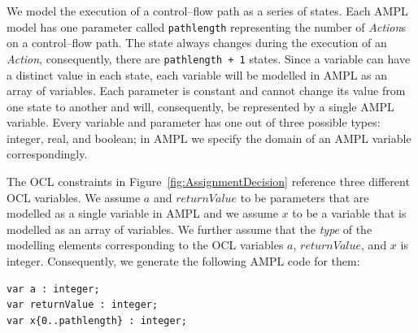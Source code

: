 \documentclass[runningheads,a4paper]{llncs}%
\newcommand{\UMLType}[1]{\textsf{\textit{#1}}} %
\newcommand{\UMLReference}[1]{\textsf{\textit{#1}}} %
\newcommand{\AMPLCode}[1]{\texttt{#1}}
\begin{document}
We model the execution of a control--flow path as a series of states. Each AMPL
model has one parameter called \AMPLCode{pathlength} representing the number of
\UMLType{Action}s on a control--flow path. The state always changes during the
execution of an \UMLType{Action}, consequently, there are \AMPLCode{pathlength +
1} states. Since a variable can have a distinct value in each state, each
variable will be modelled in AMPL as an array of variables. Each parameter is
constant and cannot change its value from one state to another and will,
consequently, be represented by a single AMPL variable. Every variable and
parameter has one out of three possible types: integer, real, and boolean; in
AMPL we specify the domain of an AMPL variable correspondingly.

The OCL constraints in Figure~\ref{fig:AssignmentDecision} reference three
different OCL variables. We assume $a$ and $returnValue$ to be parameters that
are modelled as a single variable in AMPL and we assume $x$ to be a variable that
is modelled as an array of variables. We further assume that the
\UMLReference{type} of the modelling elements corresponding to the OCL variables
$a$, ${returnValue}$, and $x$ is integer. Consequently, we generate the
following AMPL code for them: %
\begin{lstlisting}[basicstyle=\ttfamily,language=ampl]
var a : integer;
var returnValue : integer;
var x{0..pathlength} : integer;
\end{lstlisting}%
\end{document}
